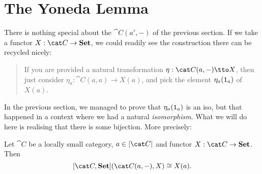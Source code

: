 
\section{The Yoneda Lemma}

There is nothing special about the \(\cat C(a', -)\) of the previous section. If we take a functor \(X : \cat C \to \Set\), we could readily see the construction there can be recycled nicely:
%
\begin{quotation}
If you are provided a natural transformation \(\eta : \cat C(a, -) \tto X\), then just consider \(\eta_a : \cat C(a, a) \to X(a)\), and pick the element \(\eta_a(\mathtt 1_a)\) of \(X(a)\).
\end{quotation}
%
In the previous section, we managed to prove that \(\eta_a(\mathtt 1_a)\) is an iso, but that happened in a context where we had a natural {\em isomorphism}. What we will do here is realising that there is some bijection. More precisely:

\begin{lemma}\label{lemma:YonedaLemmaLemma}
Let \(\cat C\) be a locally small category, \(a \in \obj{\cat C}\) and functor \(X : \cat C \to \Set\). Then
\[[\cat C, \Set](\cat C(a, -), X) \cong X(a) .\]
\end{lemma}



